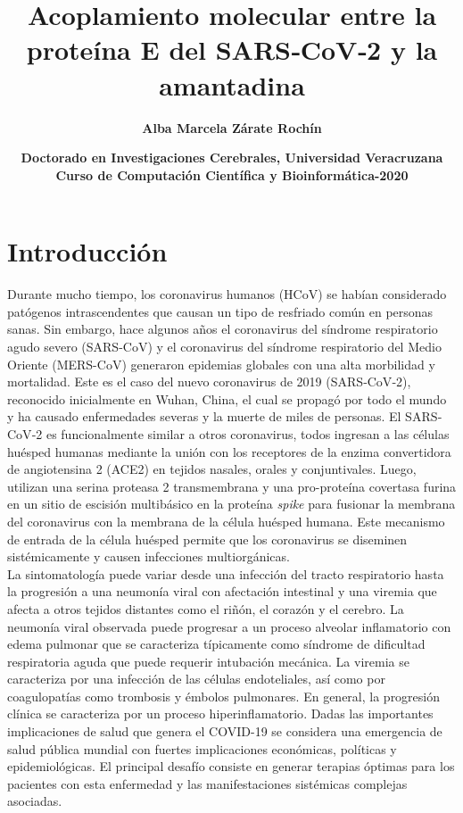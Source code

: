 \documentclass[12 pt]{article}
\title{\textbf{Acoplamiento molecular entre la proteína E del SARS‐CoV‐2 y la amantadina}}
\author{\textbf{\small{Alba Marcela Zárate Rochín}}}
\date{\textbf{\small{Doctorado en Investigaciones Cerebrales, Universidad Veracruzana\\Curso de Computación Científica y Bioinformática-2020}}}
\begin{document}
\maketitle

\section{Introducción}
Durante mucho tiempo, los coronavirus humanos (HCoV) se habían considerado patógenos intrascendentes que causan un tipo de resfriado común en personas sanas. Sin embargo, hace algunos años el coronavirus del síndrome respiratorio agudo severo (SARS-CoV) y el coronavirus del síndrome respiratorio del Medio Oriente (MERS-CoV) generaron epidemias globales con una alta morbilidad y mortalidad\citep{paules2020coronavirus}. Este es el caso del nuevo coronavirus de 2019 (SARS‐CoV‐2), reconocido inicialmente en Wuhan, China, el cual se propagó por todo el mundo y ha causado enfermedades severas y la muerte de miles de personas. El SARS‐CoV‐2 es funcionalmente similar a otros coronavirus, todos ingresan a las células huésped humanas mediante la unión con los receptores de la enzima convertidora de angiotensina 2 (ACE2) en tejidos nasales, orales y conjuntivales. Luego, utilizan una serina proteasa 2 transmembrana y una pro-proteína covertasa furina en un sitio de escisión multibásico en la proteína \textit{spike} para fusionar la membrana del coronavirus con la membrana de la célula huésped humana. Este mecanismo de entrada de la célula huésped permite que los coronavirus se diseminen sistémicamente y causen infecciones multiorgánicas\citep{stratton2020pathogenesis}.\\

La sintomatología puede variar desde una infección del tracto respiratorio hasta la progresión a una neumonía viral con afectación intestinal y una viremia que afecta a otros tejidos distantes como el riñón, el corazón y el cerebro. La neumonía viral observada puede progresar a un proceso alveolar inflamatorio con edema pulmonar que se caracteriza típicamente como síndrome de dificultad respiratoria aguda que puede requerir intubación mecánica. La viremia se caracteriza por una infección de las células endoteliales, así como por coagulopatías como trombosis y émbolos pulmonares. En general, la progresión clínica se caracteriza por un proceso hiperinflamatorio\citep{xie2020clinical}. Dadas las importantes implicaciones de salud que genera el COVID-19 se considera una emergencia de salud pública mundial con fuertes implicaciones económicas, políticas y epidemiológicas. El principal desafío consiste en generar terapias óptimas para los pacientes con esta enfermedad y las manifestaciones sistémicas complejas asociadas\citep{cummings2020epidemiology}.\\
\end{document}
